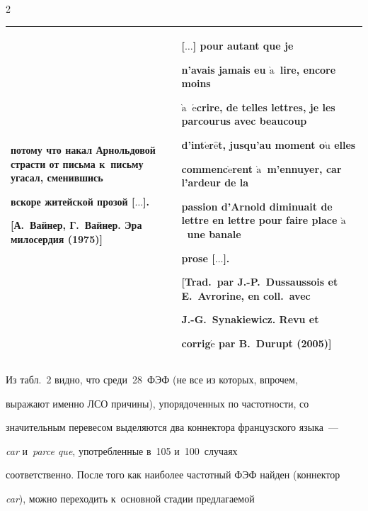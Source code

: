 \begin{multicols}{2}
\begin{table}[b]
\begin{center}
\begin{tabular}{|p{74mm}|p{84mm}|}
\textbf{потому что} накал Арнольдовой страсти от письма к~письму угасал, сменившись 


вскоре житейской прозой [$\ldots$].\newline


[А.~Вайнер, Г.~Вайнер. Эра милосердия (1975)]&[$\ldots$] \textbf{pour autant que} je 


n'avais jamais eu $\grave{\mbox{a}}$~lire, encore moins 


$\grave{\mbox{a}}$~$\acute{\mbox{e}}$crire, de telles lettres, je les parcourus avec beaucoup 


d'int$\acute{\mbox{e}}$r$\hat{\mbox{e}}$t, jusqu'au moment o$\grave{\mbox{u}}$ elles 


commenc$\grave{\mbox{e}}$rent $\grave{\mbox{a}}$~m'ennuyer, \textbf{car} l'ardeur de la 


passion d'Arnold diminuait de lettre en lettre pour faire place $\grave{\mbox{a}}$~une banale 


prose [$\ldots$].


\newline


\newline


[Trad.\ par J.-P.~Dussaussois et E.~Avrorine, en coll.\ avec 


\mbox{J.-G.}~Synakiewicz. Revu et 


corrig$\acute{\mbox{e}}$ par B.~Durupt (2005)]\\


\hline


\end{tabular}


\end{center}


\end{table}





   Из табл.~2 видно, что среди~28~ФЭФ (не все из которых, впрочем, 


выражают именно ЛСО причины), упорядоченных по частотности, со 


значительным перевесом выделяются два коннектора французского языка~--- 


\textit{car} и~\textit{parce que}, употребленные в~105 и~100~случаях 


соответственно. После того как наиболее частотный ФЭФ найден (коннектор 


\textit{car}), можно переходить к~основной стадии предлагаемой  



\end{multicols}
